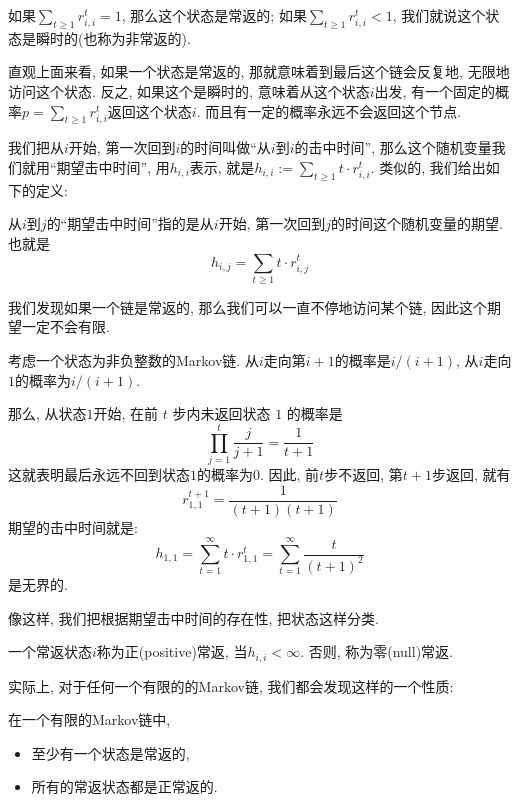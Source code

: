 \begin{definition}
    如果$\sum_{t \geq 1} r_{i, i}^t=1$, 那么这个状态是常返的; 如果$\sum_{t \geq 1} r_{i, i}^t<1$, 我们就说这个状态是瞬时的(也称为非常返的). 
\end{definition}

直观上面来看, 如果一个状态是常返的, 那就意味着到最后这个链会反复地, 无限地访问这个状态. 反之, 如果这个是瞬时的, 意味着从这个状态$i$出发, 有一个固定的概率$p=\sum_{t \geq 1} r_{i, i}^t$返回这个状态$i$. 而且有一定的概率永远不会返回这个节点. 

我们把从$i$开始, 第一次回到$i$的时间叫做``从$i$到$i$的击中时间'', 那么这个随机变量我们就用``期望击中时间'', 用$h_{i,i}$表示, 就是$h_{i, i}:=\sum_{t \geq 1} t \cdot r_{i, i}^t$.  类似的, 我们给出如下的定义: 
\begin{definition}
    从$i$到$j$的``期望击中时间''指的是从$i$开始, 第一次回到$j$的时间这个随机变量的期望. 也就是
    $$
    h_{i,j}=\sum_{t \geq 1} t \cdot r_{i, j}^t
    $$
\end{definition}

我们发现如果一个链是常返的, 那么我们可以一直不停地访问某个链, 因此这个期望一定不会有限. 

\begin{example}
    考虑一个状态为非负整数的Markov链. 从$i$走向第$i+1$的概率是$i/(i+1)$, 从$i$走向$1$的概率为$i/(i+1)$. 

    那么, 从状态$1$开始, 在前 $t$ 步内未返回状态 $1$ 的概率是
    $$
    \prod_{j=1}^t \frac{j}{j+1}=\frac{1}{t+1}
    $$
    这就表明最后永远不回到状态$1$的概率为$0$. 因此, 前$t$步不返回, 第$t+1$步返回, 就有
    $$
    r_{1,1}^{t+1}=\frac{1}{(t+1)(t+1)}
    $$
    期望的击中时间就是: 
    $$
    h_{1,1}=\sum_{t=1}^{\infty} t \cdot r_{1,1}^t=\sum_{t=1}^{\infty} \frac{t}{(t+1)^2}
    $$
    是无界的. 
\end{example}

像这样, 我们把根据期望击中时间的存在性, 把状态这样分类. 

\begin{definition}
    一个常返状态$i$称为正(positive)常返, 当$h_{i, i}<\infty$. 否则, 称为零(null)常返. 
\end{definition}

实际上, 对于任何一个有限的的Markov链, 我们都会发现这样的一个性质: 

\begin{theorem}
    \label{thm:finite-prop}
    在一个有限的Markov链中, 
    \begin{itemize}
        \item 至少有一个状态是常返的, 
        \item 所有的常返状态都是正常返的. 
    \end{itemize}    
\end{theorem}

